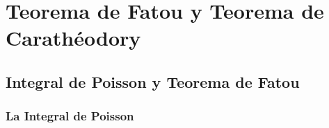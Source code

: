\chapter{Teorema de Fatou y Teorema de Carathéodory}

\begin{comment}
    \begin{theorem}[Lema de Schwart]
        Sea $f: \mathbb{D} \rightarrow \overline{\mathbb{D}}$ una función $\in \mathcal{H}(\mathbb{D})$ tal que $f(0) = 0$. Entonces:
        \begin{itemize}
            \item $\abs{f(z)} \leq \abs{z}$ para todo $z \in \mathbb{D}$.
            \item Si para algún $z_0 \not = 0$ tenemos que $\abs{f(z_0)} = \abs{z_0}$, entonces existe $\alpha \in \mathbb{C}, \abs{\alpha} = 1$ tal que $f(z)=\alpha z$.
        \end{itemize}
    \end{theorem}

    \begin{proof}
        Sea $f(z) = a_1z + \cdots$ la serie de potencias de $f$. El término constante es $0$ puesto que suponemos que $f(0) = 0$. Entonces $f(z)/z$ es una función holomorfa y
        \begin{equation*}
            \abs{\dfrac{f(z)}{z}} < 1/r \text{ para } \abs{z} = r < 1
        \end{equation*}
    \end{proof}
\end{comment}

\section{Integral de Poisson y Teorema de Fatou}

\subsection{La Integral de Poisson}

